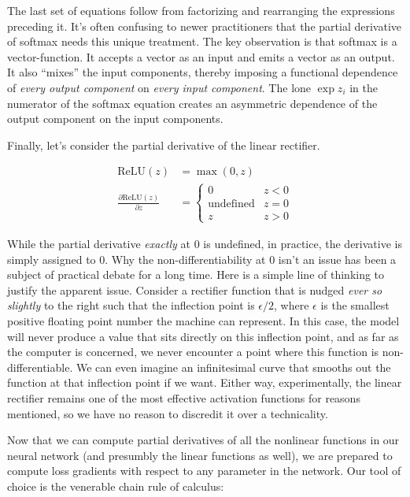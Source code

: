 The last set of equations follow from factorizing and rearranging the
expressions preceding it. It's often confusing to newer practitioners
that the partial derivative of softmax needs this unique treatment. The
key observation is that softmax is a vector-function. It accepts a
vector as an input and emits a vector as an output. It also ``mixes''
the input components, thereby imposing a functional dependence of
\emph{every output component} on \emph{every input component}. The lone
\(\exp{z_i}\) in the numerator of the softmax equation creates an
asymmetric dependence of the output component on the input components.

Finally, let's consider the partial derivative of the linear rectifier.

\[
\begin{aligned}
	\mathrm{ReLU}(z) &= \max(0, z) \\
	\frac{\partial \mathrm{ReLU}(z)}{\partial z} &=
	\begin{cases}
		0 & z < 0 \\
		\mathrm{undefined} & z = 0 \\
		z & z > 0
	\end{cases}
\end{aligned}
\]

While the partial derivative \emph{exactly} at 0 is undefined, in
practice, the derivative is simply assigned to 0. Why the
non-differentiability at 0 isn't an issue has been a subject of
practical debate for a long time. Here is a simple line of thinking to
justify the apparent issue. Consider a rectifier function that is nudged
\emph{ever so slightly} to the right such that the inflection point is
\(\epsilon / 2\), where \(\epsilon\) is the smallest positive floating
point number the machine can represent. In this case, the model will
never produce a value that sits directly on this inflection point, and
as far as the computer is concerned, we never encounter a point where
this function is non-differentiable. We can even imagine an
infinitesimal curve that smooths out the function at that inflection
point if we want. Either way, experimentally, the linear rectifier
remains one of the most effective activation functions for reasons
mentioned, so we have no reason to discredit it over a technicality.

Now that we can compute partial derivatives of all the nonlinear
functions in our neural network (and presumbly the linear functions as
well), we are prepared to compute loss gradients with respect to any
parameter in the network. Our tool of choice is the venerable chain rule
of calculus:

